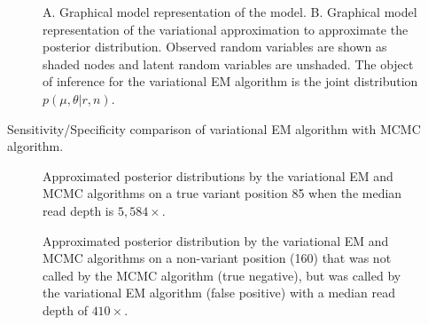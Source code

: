 \documentclass{bmcart}
\begin{document}
\begin{backmatter}



\newpage
\begin{figure}[h!]
\begin{center}
\caption{ A. Graphical model representation of the model.
B. Graphical model representation of the variational approximation  to approximate the posterior distribution.
Observed random variables are shown as shaded nodes and latent random variables are unshaded.
The object of inference for the variational EM algorithm is the joint distribution $p(\mu, \theta|r, n)$.}
\label{figure:model}
\end{center}
\end{figure}


\begin{table}[h!]
\caption{Sensitivity/Specificity comparison of variational EM algorithm with MCMC algorithm.}\label{table:mcmcvar}
\end{table}

\begin{figure}[h!]
\centering
\caption{Approximated posterior distributions by the variational EM and MCMC algorithms on a true variant position 85 when the median read depth is $5,584\times$.}\label{figure:compare1}
\end{figure}

\begin{figure}[h!]
\centering
\caption{Approximated posterior distribution by the variational EM and MCMC algorithms on a non-variant position (160) that was not called by the MCMC algorithm (true negative), but was called by the variational EM algorithm (false positive) with a median read depth of $410\times$.}\label{figure:compare2}
\end{figure}


\end{backmatter}
\end{document}
